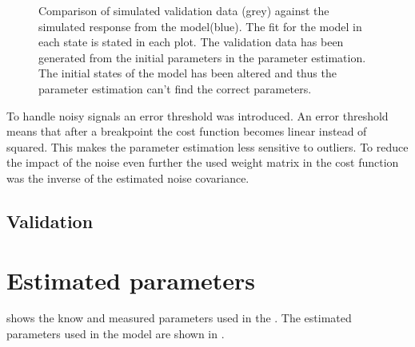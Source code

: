 \begin{figure}[tbp]
  \centering
  \qquad
  \qquad
    \qquad
    \qquad
    \qquad
  \caption{\label{fig:angVelSim}%
    Comparison of simulated validation data (grey) against the simulated response from the model(blue). The fit for the model in each state is stated in each plot. The validation data has been generated from the initial parameters in the parameter estimation. The initial states of the model has been altered and thus  the parameter estimation can't find the correct parameters.}
\end{figure}

To handle noisy signals an error threshold was introduced. An error threshold means that after a breakpoint the cost function becomes linear instead of squared. This makes the parameter estimation less sensitive to outliers. To reduce the impact of the noise even further the used weight matrix in the cost function was the inverse of the estimated noise covariance. 
\subsection{Validation}

\section{Estimated parameters}
 shows the know and measured parameters used in the \abbrROV. The estimated parameters used in the \abbrROV model are shown in .


